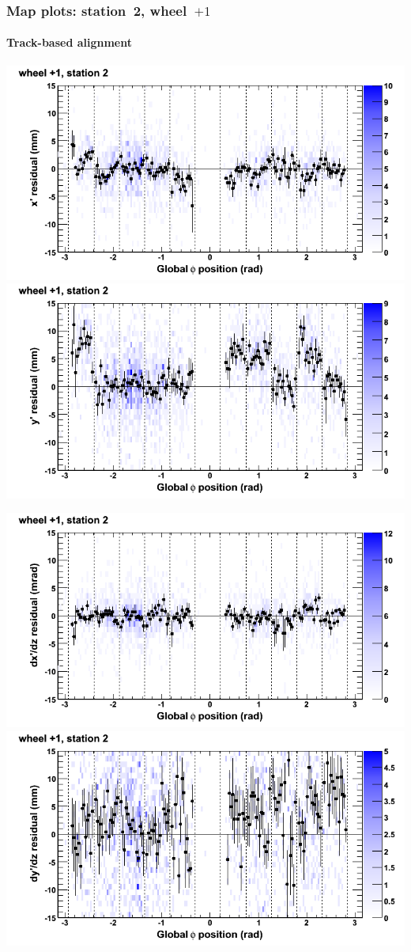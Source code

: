 \documentclass[compress]{beamer}
\begin{document}
\begin{frame}
\frametitle{Map plots: station~2, wheel~$+1$}
\framesubtitle{Track-based alignment}
\includegraphics[width=0.5\linewidth]{mapplots_re05/DTvsphi_st2whD_x.png}
\includegraphics[width=0.5\linewidth]{mapplots_re05/DTvsphi_st2whD_y.png}

\includegraphics[width=0.5\linewidth]{mapplots_re05/DTvsphi_st2whD_dxdz.png}
\includegraphics[width=0.5\linewidth]{mapplots_re05/DTvsphi_st2whD_dydz.png}
\end{frame}
\end{document}
